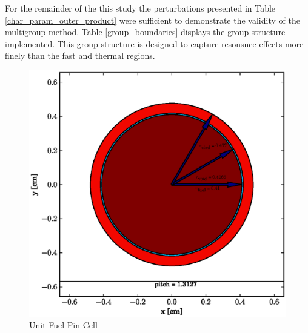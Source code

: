 For the remainder of the this study the perturbations presented in Table \ref{char_param_outer_product}
were sufficient to demonstrate the validity of the multigroup method.  Table \ref{group_boundaries} 
displays the group structure implemented.  This group structure is designed to capture resonsnce 
effects more finely than the fast and thermal regions.  

\begin{figure}[htbp]
\caption{Unit Fuel Pin Cell}
\label{fuel_pin_cell}
\begin{center}
\includegraphics[scale=0.5]{multigroup_method/figs/fuel_pin_cell.eps}
\end{center}
\end{figure}
